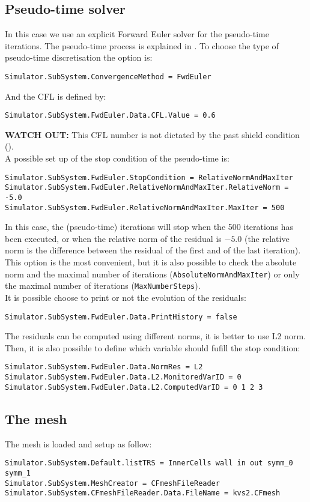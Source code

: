 \documentclass[11pt]{article}
\begin{document}
\subsection{Pseudo-time solver}
In this case we use an explicit Forward Euler solver for the pseudo-time iterations. The pseudo-time process
is explained in \cite{AIAA-paper}.
To choose the type of pseudo-time discretisation the option is:
\begin{verbatim}
Simulator.SubSystem.ConvergenceMethod = FwdEuler
\end{verbatim}
And the CFL is defined by:
\begin{verbatim}
Simulator.SubSystem.FwdEuler.Data.CFL.Value = 0.6
\end{verbatim}
{\bf WATCH OUT:} This CFL number is not dictated by the past shield condition (\cite{mr-thesis}).\\

A possible set up of the stop condition of the pseudo-time is:
\begin{verbatim}
Simulator.SubSystem.FwdEuler.StopCondition = RelativeNormAndMaxIter
Simulator.SubSystem.FwdEuler.RelativeNormAndMaxIter.RelativeNorm = -5.0
Simulator.SubSystem.FwdEuler.RelativeNormAndMaxIter.MaxIter = 500
\end{verbatim}
In this case, the (pseudo-time) iterations will stop when the 500 iterations
has been executed, or when the relative norm of the residual is $-5.0$ (the relative norm is 
the difference between the residual of the first and of the last iteration). This option is the most convenient,
but it is also possible to check the absolute norm and the maximal number of iterations (\texttt{AbsoluteNormAndMaxIter}) or
only the maximal number of iterations (\texttt{MaxNumberSteps}).\\

It is possible choose to print or not the evolution of the residuals:
\begin{verbatim}
Simulator.SubSystem.FwdEuler.Data.PrintHistory = false
\end{verbatim}
The residuals can be computed using different norms, it is better
to use L2 norm. Then, it is also possible to define which variable should 
fufill the stop condition:
\begin{verbatim}
Simulator.SubSystem.FwdEuler.Data.NormRes = L2
Simulator.SubSystem.FwdEuler.Data.L2.MonitoredVarID = 0
Simulator.SubSystem.FwdEuler.Data.L2.ComputedVarID = 0 1 2 3
\end{verbatim}
\subsection{The mesh}
The mesh is loaded and setup as follow:
\begin{verbatim}
Simulator.SubSystem.Default.listTRS = InnerCells wall in out symm_0 symm_1
Simulator.SubSystem.MeshCreator = CFmeshFileReader
Simulator.SubSystem.CFmeshFileReader.Data.FileName = kvs2.CFmesh
\end{verbatim}
\end{document}
